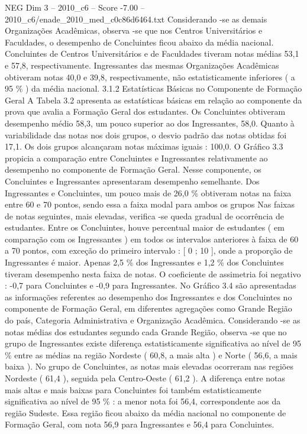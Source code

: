 \begin{textsample}{NEG Dim 3 – 2010\_c6 – Score -7.00 – 2010\_c6/enade\_2010\_med\_c0c86d6464.txt}
Considerando -se as demais Organizações Acadêmicas, observa -se que nos Centros Universitários e Faculdades, o desempenho de Concluintes ficou abaixo da média nacional.
Concluintes de Centros Universitários e de Faculdades tiveram notas médias 53,1 e 57,8, respectivamente.
Ingressantes das mesmas Organizações Acadêmicas obtiveram notas 40,0 e 39,8, respectivamente, não estatisticamente inferiores ( a 95 \% ) da média nacional. 3.1.2 Estatísticas Básicas no Componente de Formação Geral A Tabela 3.2 apresenta as estatísticas básicas em relação ao componente da prova que avalia a Formação Geral dos estudantes.
Os Concluintes obtiveram desempenho médio 58,3, um pouco superior ao dos Ingressantes, 58,0.
Quanto à variabilidade das notas nos dois grupos, o desvio padrão das notas obtidas foi 17,1.
Os dois grupos alcançaram notas máximas iguais : 100,0.
O Gráfico 3.3 propicia a comparação entre Concluintes e Ingressantes relativamente ao desempenho no componente de Formação Geral.
Nesse componente, os Concluintes e Ingressantes apresentaram desempenho semelhante.
Dos Ingressantes e Concluintes, um pouco mais de 26,0 \% obtiveram notas na faixa entre 60 e 70 pontos, sendo essa a faixa modal para ambos os grupos Nas faixas de notas seguintes, mais elevadas, verifica -se queda gradual de ocorrência de estudantes.
Entre os Concluintes, houve percentual maior de estudantes ( em comparação com os Ingressantes ) em todos os intervalos anteriores à faixa de 60 a 70 pontos, com exceção do primeiro intervalo : [ 0 ; 10 ], onde a proporção de Ingressantes é maior.
Apenas 2,5 \% dos Ingressantes e 1,2 \% dos Concluintes tiveram desempenho nesta faixa de notas.
O coeficiente de assimetria foi negativo : -0,7 para Concluintes e -0,9 para Ingressantes.
No Gráfico 3.4 são apresentadas as informações referentes ao desempenho dos Ingressantes e dos Concluintes no componente de Formação Geral, em diferentes agregações como Grande Região do país, Categoria Administrativa e Organização Acadêmica.
Considerando -se as notas médias dos estudantes segundo cada Grande Região, observa -se que no grupo de Ingressantes existe diferença estatisticamente significativa ao nível de 95 \% entre as médias na região Nordeste ( 60,8, a mais alta ) e Norte ( 56,6, a mais baixa ).
No grupo de Concluintes, as notas mais elevadas ocorreram nas regiões Nordeste ( 61,4 ), seguida pela Centro-Oeste ( 61,2 ).
A diferença entre notas mais altas e mais baixas para Concluintes foi também estatisticamente significativa ao nível de 95 \% : a menor nota foi 56,4, correspondente aos da região Sudeste.
Essa região ficou abaixo da média nacional no componente de Formação Geral, com nota 56,9 para Ingressantes e 56,4 para Concluintes.

\end{textsample}
